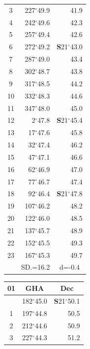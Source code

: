 \documentclass[10pt, a4paper]{report}
\begin{document}
\begin{scriptsize}
\begin{tabular*}{0.2\textwidth}[t]{@{\extracolsep{\fill}}|c|rr|}
3 & 227$^\circ$49.9 & \raisebox{0.24ex}{\boldmath$\cdot$~\boldmath$\cdot$~~}41.9\\
4 & 242$^\circ$49.6 & 42.3\\
5 & 257$^\circ$49.4 & 42.6\\[2Pt]
6 & 272$^\circ$49.2 & \textbf{S}21$^\circ$43.0\\
7 & 287$^\circ$49.0 & 43.4\\
8 & 302$^\circ$48.7 & 43.8\\
9 & 317$^\circ$48.5 & \raisebox{0.24ex}{\boldmath$\cdot$~\boldmath$\cdot$~~}44.2\\
10 & 332$^\circ$48.3 & 44.6\\
11 & 347$^\circ$48.0 & 45.0\\[2Pt]
12 & 2$^\circ$47.8 & \textbf{S}21$^\circ$45.4\\
13 & 17$^\circ$47.6 & 45.8\\
14 & 32$^\circ$47.4 & 46.2\\
15 & 47$^\circ$47.1 & \raisebox{0.24ex}{\boldmath$\cdot$~\boldmath$\cdot$~~}46.6\\
16 & 62$^\circ$46.9 & 47.0\\
17 & 77$^\circ$46.7 & 47.4\\[2Pt]
18 & 92$^\circ$46.4 & \textbf{S}21$^\circ$47.8\\
19 & 107$^\circ$46.2 & 48.2\\
20 & 122$^\circ$46.0 & 48.5\\
21 & 137$^\circ$45.7 & \raisebox{0.24ex}{\boldmath$\cdot$~\boldmath$\cdot$~~}48.9\\
22 & 152$^\circ$45.5 & 49.3\\
23 & 167$^\circ$45.3 & 49.7\\
\hline
\rule{0pt}{2.4ex} & \multicolumn{1}{c}{SD.=16.2} & \multicolumn{1}{c|}{d=-0.4}\\
\hline
\end{tabular*}\noindent
\begin{tabular*}{0.2\textwidth}[t]{@{\extracolsep{\fill}}|c|rr|}
\hline
\multicolumn{1}{|c|}{\rule{0pt}{2.6ex}\textbf{01}} & \multicolumn{1}{c}{\textbf{GHA}} & \multicolumn{1}{c|}{\textbf{Dec}}\\
\hline\rule{0pt}{2.6ex}\noindent
0 & 182$^\circ$45.0 & \textbf{S}21$^\circ$50.1\\
1 & 197$^\circ$44.8 & 50.5\\
2 & 212$^\circ$44.6 & 50.9\\
3 & 227$^\circ$44.3 & \raisebox{0.24ex}{\boldmath$\cdot$~\boldmath$\cdot$~~}51.2\\

\end{tabular*}
\end{scriptsize}
\end{document}
